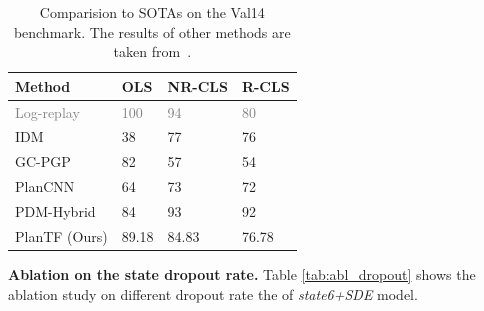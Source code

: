 \documentclass[letterpaper, 10 pt, conference]{ieeeconf}  %
\newcommand{\fadedtext}[1]{\textcolor{gray}{#1}}
\renewcommand{\paragraph}[1]{\vspace{1.25mm}\noindent\textbf{#1}}
\begin{document}
\begin{table}[h]
\vspace{6pt}
\begin{center}
\setlength{\tabcolsep}{7pt}
\renewcommand{\arraystretch}{1.2}
\small
\begin{tabular}{y{70}|x{30}x{35}x{30}}
\toprule
Method       & OLS & NR-CLS & R-CLS \\ \midrule
\fadedtext{Log-replay}   & \fadedtext{100} & \fadedtext{94}     & \fadedtext{80}    \\
IDM~\cite{treiber2000idm}          & 38  & 77     & 76    \\
GC-PGP~\cite{hallgarten2023gc-pgp}       & 82  & 57     & 54    \\
PlanCNN~\cite{caesar2021nuplan}      & 64  & 73     & 72    \\
PDM-Hybrid~\cite{Dauner2023CORL}   & 84  & 93     & 92    \\ \midrule
PlanTF (Ours) & 89.18    & 84.83  & 76.78 \\ \bottomrule
\end{tabular}
\end{center}
\vspace{0.5em}
\caption{Comparision to SOTAs on the Val14 benchmark. The results of other methods are taken from~\cite{Dauner2023CORL}.}
\label{tab:val14}
\end{table}

\paragraph{Ablation on the state dropout rate.} Table \ref{tab:abl_dropout} shows the ablation study on different dropout rate the of \textit{state6+SDE} model.
\end{document}
